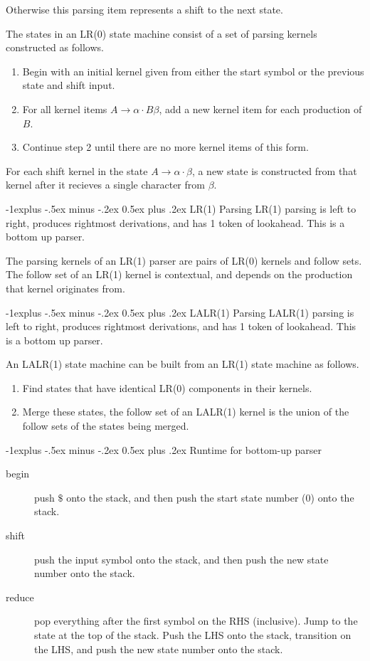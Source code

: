 \documentclass[10pt, landscape, a4]{article}
\makeatletter
\renewcommand{\subsection}{\@startsection{subsection}{2}{0mm}%
{-1explus -.5ex minus -.2ex}%
{0.5ex plus .2ex}%
{\normalfont\normalsize\bfseries}}
\makeatother
\begin{document}
\begin{multicols}{3}
Otherwise this parsing item represents a shift to the next state.

The states in an LR(0) state machine consist of a set of parsing kernels constructed as follows.
\begin{enumerate}
    \item Begin with an initial kernel given from either the start symbol or the previous state and shift input.
    \item For all kernel items $A \rightarrow \alpha \cdot B \beta$, add a new kernel item for each production of $B$.
    \item Continue step 2 until there are no more kernel items of this form.
\end{enumerate}
For each shift kernel in the state $A \rightarrow \alpha \cdot \beta$, a new state is constructed from that kernel after it recieves a single character from $\beta$.

\subsection{LR(1) Parsing}
LR(1) parsing is left to right, produces rightmost derivations, and has 1 token of lookahead. This is a bottom up parser.

The parsing kernels of an LR(1) parser are pairs of LR(0) kernels and follow sets. The follow set of an LR(1) kernel is contextual, and depends on the production that kernel originates from.

\subsection{LALR(1) Parsing}
LALR(1) parsing is left to right, produces rightmost derivations, and has 1 token of lookahead. This is a bottom up parser.

An LALR(1) state machine can be built from an LR(1) state machine as follows.
\begin{enumerate}
    \item Find states that have identical LR(0) components in their kernels.
    \item Merge these states, the follow set of an LALR(1) kernel is the union of the follow sets of the states being merged.
\end{enumerate}

\subsection{Runtime for bottom-up parser}
\begin{description}
\item[begin] push $\$$ onto the stack, and then push the start state number (0) onto the stack.
\item[shift] push the input symbol onto the stack, and then push the new state number onto the stack.
\item[reduce] pop everything after the first symbol on the RHS (inclusive). Jump to the state at the top of the stack. Push the LHS onto the stack, transition on the LHS, and push the new state number onto the stack.
\end{description}


\end{multicols}
\end{document}
